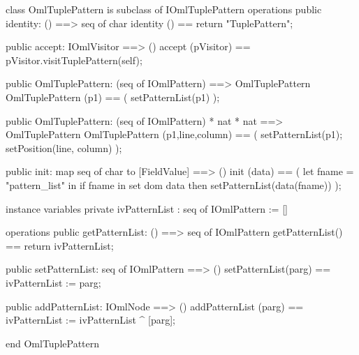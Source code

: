 \begin{vdm_al}
class OmlTuplePattern is subclass of IOmlTuplePattern
operations
  public identity: () ==> seq of char
  identity () == return "TuplePattern";

  public accept: IOmlVisitor ==> ()
  accept (pVisitor) == pVisitor.visitTuplePattern(self);

  public OmlTuplePattern:
    (seq of IOmlPattern) ==> OmlTuplePattern
  OmlTuplePattern (p1) == 
    ( setPatternList(p1) );

  public OmlTuplePattern:
    (seq of IOmlPattern) *
    nat *
    nat ==> OmlTuplePattern
  OmlTuplePattern (p1,line,column) == 
    ( setPatternList(p1);
      setPosition(line, column) );

  public init: map seq of char to [FieldValue] ==> ()
  init (data) ==
    ( let fname = "pattern_list" in
        if fname in set dom data
        then setPatternList(data(fname)) );

instance variables
  private ivPatternList : seq of IOmlPattern := []

operations
  public getPatternList: () ==> seq of IOmlPattern
  getPatternList() == return ivPatternList;

  public setPatternList: seq of IOmlPattern ==> ()
  setPatternList(parg) == ivPatternList := parg;

  public addPatternList: IOmlNode ==> ()
  addPatternList (parg) == ivPatternList := ivPatternList ^ [parg];

end OmlTuplePattern
\end{vdm_al}

